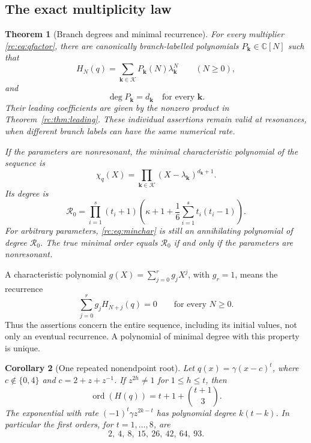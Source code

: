 \documentclass[11pt,a4paper]{article}
\numberwithin{equation}{section}
\newtheorem{theorem}{Theorem}[section]
\newtheorem{corollary}[theorem]{Corollary}
\theoremstyle{definition}
\theoremstyle{remark}
\newcommand{\CC}{\mathbb C}
\newcommand{\bk}{\boldsymbol{k}}
\newcommand{\ord}{\operatorname{ord}}
\newcommand{\Rzero}{\mathcal R_0}
\begin{document}
\subsection{The exact multiplicity law}
\begin{theorem}[Branch degrees and minimal recurrence]\label{rc:thm:main}
For every multiplier \eqref{rc:eq:qfactor}, there are canonically
branch-labelled polynomials $P_{\bk}\in\CC[N]$ such that
\begin{equation}\label{rc:eq:sectors}
 H_N(q)=\sum_{\bk\in\mathcal K}P_{\bk}(N)\lambda_{\bk}^{N}
 \qquad(N\ge0),
\end{equation}
and
\begin{equation}\label{rc:eq:exactdegree}
 \deg P_{\bk}=d_{\bk}\quad\text{for every }\bk.
\end{equation}
Their leading coefficients are given by the nonzero product in
Theorem~\ref{rc:thm:leading}.  These individual assertions remain valid at
resonances, when different branch labels can have the same numerical rate.

If the parameters are nonresonant, the minimal characteristic polynomial
of the sequence is
\begin{equation}\label{rc:eq:minchar}
 \chi_q(X)=\prod_{\bk\in\mathcal K}
                         (X-\lambda_{\bk})^{d_{\bk}+1}.
\end{equation}
Its degree is
\begin{equation}\label{rc:eq:R}
 \boxed{\quad
 \Rzero=\prod_{i=1}^{s}(t_i+1)
       \left(\kappa+1+\frac16\sum_{i=1}^{s}t_i(t_i-1)\right).
 \quad}
\end{equation}
For arbitrary parameters, \eqref{rc:eq:minchar} is still an annihilating
polynomial of degree $\Rzero$.  The true minimal order equals $\Rzero$
if and only if the parameters are nonresonant.
\end{theorem}

A characteristic polynomial $g(X)=\sum_{j=0}^r g_jX^j$, with $g_r=1$,
means the recurrence
\begin{equation}\label{rc:eq:recconvention}
 \sum_{j=0}^r g_jH_{N+j}(q)=0\qquad\text{for every }N\ge0.
\end{equation}
Thus the assertions concern the entire sequence, including its initial
values, not only an eventual recurrence.  A polynomial of minimal degree
with this property is unique.

\begin{corollary}[One repeated nonendpoint root]\label{rc:cor:single}
Let $q(x)=\gamma(x-c)^t$, where $c\notin\{0,4\}$ and
$c=2+z+z^{-1}$.  If $z^{2h}\ne1$ for $1\le h\le t$, then
\begin{equation}\label{rc:eq:singleorder}
 \ord(H(q))=t+1+\binom{t+1}{3}.
\end{equation}
The exponential with rate $(-1)^t\gamma z^{2k-t}$ has polynomial degree
$k(t-k)$.  In particular the first orders, for $t=1,\ldots,8$, are
\[
 2,\ 4,\ 8,\ 15,\ 26,\ 42,\ 64,\ 93.
\]
\end{corollary}
\end{document}
